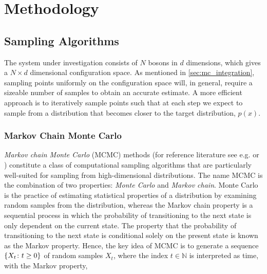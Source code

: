 \section{Methodology}\label{sec:Method}

\subsection{Sampling Algorithms}\label{sec:sampling_algos}

The system under investigation consists of $N$ bosons in $d$ dimensions, which gives a $N\times d$ dimensional configuration space. As mentioned in \autoref{sec:mc_integration}, sampling points uniformly on the configuration space will, in general, require a sizeable number of samples to obtain an accurate estimate. A more efficient approach is to iteratively sample points such that at each step we expect to sample from a distribution that becomes closer to the target distribution, $p(x)$.

\subsubsection{Markov Chain Monte Carlo}


\textit{Markov chain Monte Carlo} (MCMC) methods (for reference literature see e.g. \cite{ProbModels} or \cite{BDA}) constitute a class of computational sampling algorithms that are particularly well-suited for sampling from high-dimensional distributions. The name MCMC is the combination of two properties: \textit{Monte Carlo} and \textit{Markov chain}. Monte Carlo is the practice of estimating statistical properties of a distribution by examining random samples from the distribution, whereas the Markov chain property is a sequential process in which the probability of transitioning to the next state is only dependent on the current state. The property that the probability of transitioning to the next state is conditional solely on the present state is known as the Markov property. Hence, the key idea of MCMC is to generate a sequence $\qty{X_t \colon t\geq 0}$ of random samples $X_t$, where the index $t \in \mathbb{N}$ is interpreted as time, with the Markov property,

